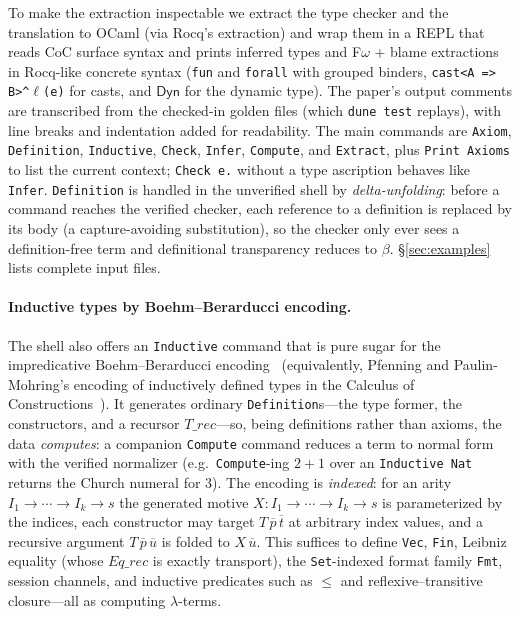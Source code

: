 \documentclass[acmsmall,anonymous=false,nonacm]{acmart}
\newcommand{\dyn}{\ensuremath{\mathsf{Dyn}}}
\begin{document}
To make the extraction inspectable we extract the type checker and the
translation to OCaml (via Rocq's extraction) and wrap them in a REPL that reads
CoC surface syntax and prints inferred types and F$\omega$ + blame extractions
in Rocq-like concrete syntax (\texttt{fun} and \texttt{forall} with grouped
binders, \texttt{cast<A => B>\^{}$\ell$(e)} for casts, and $\dyn$ for the
dynamic type). The paper's output comments are transcribed from the
checked-in golden files (which \texttt{dune test} replays), with line breaks
and indentation added for readability. The main commands
are \texttt{Axiom}, \texttt{Definition}, \texttt{Inductive}, \texttt{Check},
\texttt{Infer}, \texttt{Compute}, and \texttt{Extract}, plus \texttt{Print
Axioms} to list the current context; \texttt{Check e.} without a type ascription
behaves like \texttt{Infer}.
\texttt{Definition} is handled in the unverified shell by \emph{delta-unfolding}:
before a command reaches the verified checker, each reference to a definition is
replaced by its body (a capture-avoiding substitution), so the checker only ever
sees a definition-free term and definitional transparency reduces to $\beta$.
\S\ref{sec:examples} lists complete input files.

\paragraph{Inductive types by Boehm--Berarducci encoding.}
The shell also offers an \texttt{Inductive} command that is pure sugar for the
impredicative Boehm--Berarducci encoding~\cite{bohm1985automatic}
(equivalently, Pfenning and Paulin-Mohring's encoding of inductively defined
types in the Calculus of Constructions~\cite{pfenning1990inductively}). It
generates ordinary \texttt{Definition}s---the type former, the constructors, and
a recursor $T\_\mathit{rec}$---so, being definitions rather than axioms, the
data \emph{computes}: a companion \texttt{Compute} command reduces a term to
normal form with the verified normalizer (e.g.\ \texttt{Compute}-ing $2+1$ over
an \texttt{Inductive Nat} returns the Church numeral for $3$). The encoding is
\emph{indexed}: for an arity $I_1 \to \cdots \to I_k \to s$ the generated motive
$X : I_1 \to \cdots \to I_k \to s$ is parameterized by the indices, each
constructor may target $T\,\overline{p}\,\overline{t}$ at arbitrary index
values, and a recursive argument $T\,\overline{p}\,\overline{u}$ is folded to
$X\,\overline{u}$. This suffices to define \texttt{Vec}, \texttt{Fin}, Leibniz
equality (whose $Eq\_\mathit{rec}$ is exactly transport), the \texttt{Set}-indexed
format family \texttt{Fmt}, session channels, and inductive predicates such as
$\le$ and reflexive--transitive closure---all as computing $\lambda$-terms.
\end{document}
